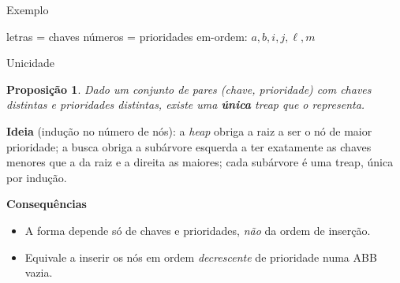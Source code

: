 \documentclass[aspectratio=169,11pt]{beamer}
\newtheorem{proposicao}[theorem]{Proposição}
\theoremstyle{definition}
\begin{document}
\begin{frame}{Exemplo}
  \centering

  \vfill
  
  \small letras = chaves \quad números = prioridades \quad
  em-ordem: $a,b,i,j,\ell,m$
\end{frame}

\begin{frame}{Unicidade}
  \begin{proposicao}
    Dado um conjunto de pares (chave, prioridade) com chaves distintas
    e prioridades distintas, existe uma \textbf{única} treap que o
    representa.
  \end{proposicao}
  \pause
  \textbf{Ideia} (indução no número de nós): a \emph{heap} obriga a
  raiz a ser o nó de maior prioridade; a busca obriga a subárvore
  esquerda a ter exatamente as chaves menores que a da raiz e a direita
  as maiores; cada subárvore é uma treap, única por indução.
  \pause
  \medskip

  \textbf{Consequências}
  \begin{itemize}
  \item A forma depende só de chaves e prioridades, \emph{não} da
    ordem de inserção.
  \item Equivale a inserir os nós em ordem \emph{decrescente} de
    prioridade numa ABB vazia.
  \end{itemize}
\end{frame}
\end{document}
